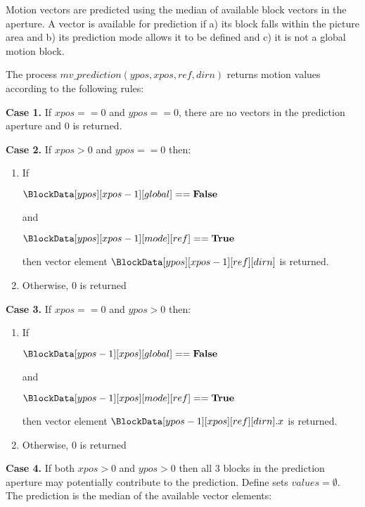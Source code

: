 Motion vectors are predicted using the median of available block vectors in the aperture. A vector is available for
prediction if a) its block falls within the picture area and b) its prediction mode allows it to be defined and c) it
is not a global motion block. 

The process $mv\_prediction(ypos, xpos, ref, dirn)$ returns motion values according to
the following rules:

{\bf Case 1.}  If $xpos==0$ and $ypos==0$, there are no vectors in the prediction aperture and
 $0$ is returned.

{\bf Case 2.} If $xpos>0$ and $ypos==0$ then:
\begin{enumerate}
   \item If 

$\BlockData[ypos][xpos-1][global]==\false$ 

and 

$\BlockData[ypos][xpos-1][mode][ref]==\true$ 

then vector element $\BlockData[ypos][xpos-1][ref][dirn]$ is returned.

   \item Otherwise, $0$ is returned
\end{enumerate}

{\bf Case 3.} If $xpos==0$ and $ypos>0$ then:
\begin{enumerate}
   \item If 

$\BlockData[ypos-1][xpos][global]==\false$ 

and 

$\BlockData[ypos-1][xpos][mode][ref]==\true$

then vector element $\BlockData[ypos-1][xpos][ref][dirn].x$ is returned.

   \item Otherwise, $0$ is returned
\end{enumerate}

{\bf Case 4.} If both $xpos>0$ and $ypos>0$ then all 3 blocks in the prediction aperture may potentially
contribute to the prediction. Define sets $values=\emptyset$. The prediction is the 
median of the available vector elements:

\begin{pseudo*}
    \bsIF{\BlockData[ypos][xpos-1][global]==\false}
        \bsIF{\BlockData[ypos][xpos-1][mode][ref]==\true}
        \bsEND
    \bsEND
    \bsIF{\BlockData[ypos-1][xpos][global]==\false}
        \bsIF{\BlockData[ypos-1][xpos][mode][ref]==\true}
        \bsEND
    \bsEND
    \bsIF{\BlockData[ypos-1][xpos-1][global]==\false}
        \bsIF{\BlockData[ypos-1][xpos-1][mode][ref]==\true}
        \bsEND
    \bsEND

\bsEND
\end{pseudo*}

